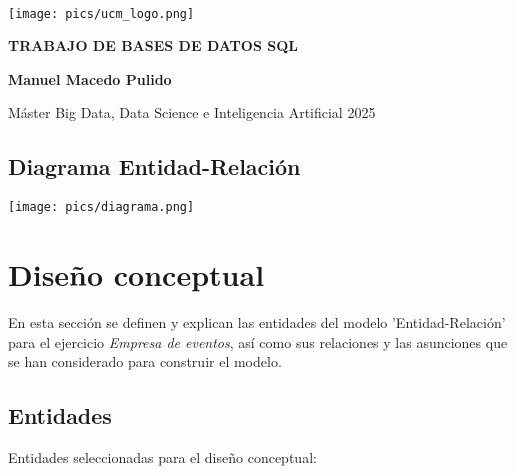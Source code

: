 \documentclass[12pt]{article}
\begin{document}
\begin{titlepage}

        \centering
        {\bfseries \ }
        \vspace{2cm}
        
        {\texttt{[image: pics/ucm\_logo.png]}} 
        \vspace{0.6cm}
        
        {\bfseries \Large TRABAJO DE BASES DE DATOS SQL}
        \vspace{1.75cm}
        
        {\bfseries \LARGE Manuel Macedo Pulido}
        \vspace{6mm} 

        {\large Máster Big Data, Data Science e Inteligencia Artificial}
        {\large 2025 }
        \vspace{6mm}

        \thispagestyle{empty}

    \end{titlepage}

    \setcounter{page}{1}

    \newpage
    \tableofcontents

    \newpage
    \begin{landscape}

        \section{Diagrama Entidad-Relación}
        {\texttt{[image: pics/diagrama.png]}} 

    \end{landscape}

    \newpage
    \section{Diseño conceptual}
    En esta sección se definen y explican las entidades del modelo 'Entidad-Relación' para el ejercicio \textit{Empresa de eventos}, 
    así como sus relaciones y las asunciones que se han considerado para construir el modelo. 

    \subsection{Entidades}
    Entidades seleccionadas para el diseño conceptual:
\end{document}
